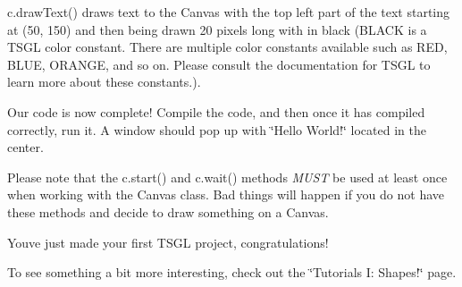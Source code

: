 c.\+draw\+Text() draws text to the Canvas with the top left part of the text starting at (50, 150) and then being drawn 20 pixels long with in black (B\+L\+A\+C\+K is a T\+S\+G\+L color constant. There are multiple color constants available such as R\+E\+D, B\+L\+U\+E, O\+R\+A\+N\+G\+E, and so on. Please consult the documentation for T\+S\+G\+L to learn more about these constants.).

Our code is now complete! Compile the code, and then once it has compiled correctly, run it. A window should pop up with \char`\"{}\+Hello World!\char`\"{} located in the center.

Please note that the c.\+start() and c.\+wait() methods {\itshape M\+U\+S\+T} be used at least once when working with the Canvas class. Bad things will happen if you do not have these methods and decide to draw something on a Canvas.

You\textquotesingle{}ve just made your first T\+S\+G\+L project, congratulations!

To see something a bit more interesting, check out the \char`\"{}\+Tutorials I\+: Shapes!\char`\"{} page. 